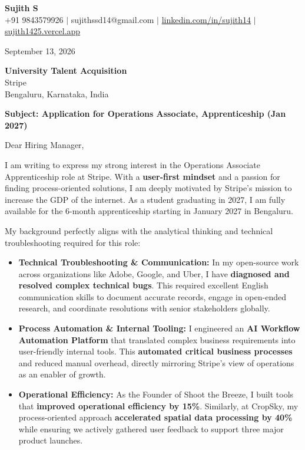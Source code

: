 \documentclass[a4paper,11pt]{article}
\begin{document}
\pagestyle{empty}

\begin{center}
{\color[HTML]{000000}\fontsize{24}{28}\selectfont\bfseries Sujith S} \\[5pt]
{\fontsize{10.5}{12.5}\selectfont\textcolor[HTML]{3A3A3A}{+91 9843579926 $|$ sujithssd14@gmail.com $|$ \href{https://linkedin.com/in/sujith14}{linkedin.com/in/sujith14} $|$ \href{https://sujith1425.vercel.app}{sujith1425.vercel.app}}}
\end{center}

\vspace{2em}

September 13, 2026

\textbf{University Talent Acquisition} \\
Stripe \\
Bengaluru, Karnataka, India

\textbf{Subject: Application for Operations Associate, Apprenticeship (Jan 2027)}

Dear Hiring Manager,

I am writing to express my strong interest in the Operations Associate Apprenticeship role at Stripe. With a \textbf{user-first mindset} and a passion for finding process-oriented solutions, I am deeply motivated by Stripe's mission to increase the GDP of the internet. As a student graduating in 2027, I am fully available for the 6-month apprenticeship starting in January 2027 in Bengaluru.

My background perfectly aligns with the analytical thinking and technical troubleshooting required for this role:
\begin{itemize}
    \item \textbf{Technical Troubleshooting \& Communication:} In my open-source work across organizations like Adobe, Google, and Uber, I have \textbf{diagnosed and resolved complex technical bugs}. This required excellent English communication skills to document accurate records, engage in open-ended research, and coordinate resolutions with senior stakeholders globally.
    \item \textbf{Process Automation \& Internal Tooling:} I engineered an \textbf{AI Workflow Automation Platform} that translated complex business requirements into user-friendly internal tools. This \textbf{automated critical business processes} and reduced manual overhead, directly mirroring Stripe's view of operations as an enabler of growth.
    \item \textbf{Operational Efficiency:} As the Founder of Shoot the Breeze, I built tools that \textbf{improved operational efficiency by 15\%}. Similarly, at CropSky, my process-oriented approach \textbf{accelerated spatial data processing by 40\%} while ensuring we actively gathered user feedback to support three major product launches.
\end{itemize}
\end{document}
